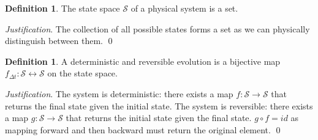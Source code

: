 \documentclass[aps,pra,10pt,twocolumn,floatfix,nofootinbib]{revtex4-1}
\theoremstyle{definition}
\newtheorem{defn}[prop]{Definition}
\newenvironment{justification}{\emph{Justification}.}{\qed}
\begin{document}
\begin{defn}\label{statedef}
The state space $\mathcal{S}$ of a physical system is a set.
\end{defn}

\begin{justification}
The collection of all possible states forms a set as we can physically distinguish between them.
\end{justification}

\begin{defn}\label{detrevmap}
A deterministic and reversible evolution is a bijective map $f_{\Delta t}:\mathcal{S} \leftrightarrow \mathcal{S}$ on the state space.
\end{defn}

\begin{justification}
The system is deterministic: there exists a map $f:\mathcal{S} \rightarrow \mathcal{S}$ that returns the final state given the initial state. The system is reversible: there exists a map $g:\mathcal{S} \rightarrow \mathcal{S}$ that returns the initial state given the final state. $g \circ f = id$ as mapping forward and then backward must return the original element.
\end{justification}

\end{document}
